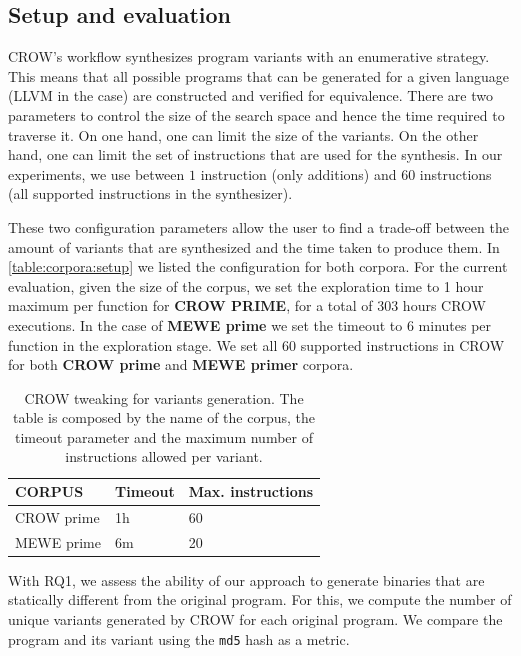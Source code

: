 \subsection{Setup and evaluation}

CROW's workflow synthesizes program variants with an enumerative strategy. This means that all possible programs that can be generated for a given language (LLVM in the case) are constructed and verified for equivalence.
There are two parameters to control the size of the search space and hence the time required to traverse it.
On one hand, one can limit the size of the variants. On the other hand, one can limit the set of instructions that are used for the synthesis. In our experiments, we use between $1$ instruction (only additions) and $60$ instructions (all supported instructions in the synthesizer).


These two  configuration parameters allow the user to find a trade-off between the amount of variants that are synthesized and the time taken to produce them. In \autoref{table:corpora:setup} we listed the configuration for both corpora. For the current evaluation, given the size of the corpus, we set the exploration time to 1 hour maximum per function for \textbf{CROW PRIME}, for a total of 303 hours CROW executions. In the case of \textbf{MEWE prime} we set the timeout to 6 minutes per function in the exploration stage. We set all 60 supported instructions in CROW for both \textbf{CROW prime} and \textbf{MEWE primer} corpora.

\begin{table}[h]
    \renewcommand{\arraystretch}{1.2}
    \centering
    \begin{tabular}{l l l}
        \midrule
        CORPUS & Timeout & Max. instructions \\
        \hline
        CROW prime & 1h & 60 \\
        \hline
        MEWE prime & 6m & 20 \\
    \end{tabular}
    \caption{CROW tweaking for variants generation. The table is composed by the name of the corpus, the timeout parameter and the maximum number of instructions allowed per variant.}
    \label{table:corpora:setup}
\end{table}


With RQ1,
we assess the ability of our approach to generate \wasm binaries that are statically different from the original program.
For this, we compute the number of unique variants generated by CROW for each original program. 
We compare the \wasm program and its variant using the \texttt{md5} hash as a metric. 

